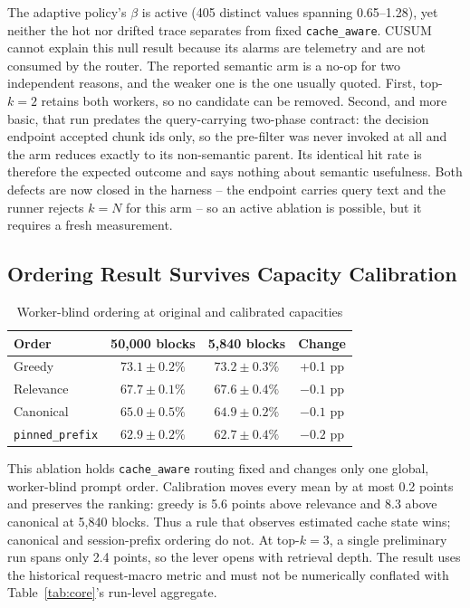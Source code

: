 \documentclass[conference]{IEEEtran}
\begin{document}
The adaptive policy's $\beta$ is active (405 distinct values spanning
0.65--1.28), yet neither the hot nor drifted trace separates from fixed
\texttt{cache\_aware}. CUSUM cannot explain this null result because its
alarms are telemetry and are not consumed by the router. The reported
semantic arm is a no-op for two independent reasons, and the weaker one is
the one usually quoted. First, top-$k{=}2$ retains both workers, so no
candidate can be removed. Second, and more basic, that run predates the
query-carrying two-phase contract: the decision endpoint accepted chunk ids
only, so the pre-filter was never invoked at all and the arm reduces
exactly to its non-semantic parent. Its identical hit rate is therefore the
expected outcome and says nothing about semantic usefulness. Both defects
are now closed in the harness -- the endpoint carries query text and the
runner rejects $k{=}N$ for this arm -- so an active ablation is possible,
but it requires a fresh measurement.

\subsection{Ordering Result Survives Capacity Calibration}

\begin{table}[t]
\caption{Worker-blind ordering at original and calibrated capacities}
\label{tab:ordering}
\centering
\footnotesize
\begin{tabular}{@{}lccc@{}}
\toprule
\textbf{Order} & \textbf{50{,}000 blocks} & \textbf{5{,}840 blocks} & \textbf{Change} \\
\midrule
Greedy & $73.1{\pm}0.2\%$ & $73.2{\pm}0.3\%$ & +0.1 pp \\
Relevance & $67.7{\pm}0.1\%$ & $67.6{\pm}0.4\%$ & $-0.1$ pp \\
Canonical & $65.0{\pm}0.5\%$ & $64.9{\pm}0.2\%$ & $-0.1$ pp \\
\texttt{pinned\_prefix} & $62.9{\pm}0.2\%$ & $62.7{\pm}0.4\%$ & $-0.2$ pp \\
\bottomrule
\end{tabular}
\end{table}

This ablation holds \texttt{cache\_aware} routing fixed and changes
only one global, worker-blind prompt order. Calibration moves every mean
by at most 0.2 points and preserves the ranking: greedy is 5.6 points
above relevance and 8.3 above canonical at 5{,}840 blocks. Thus a rule
that observes estimated cache state wins; canonical and session-prefix
ordering do not. At top-$k{=}3$, a single preliminary run spans only 2.4
points, so the lever opens with retrieval depth. The result uses the
historical request-macro metric and must not be numerically conflated
with Table~\ref{tab:core}'s run-level aggregate.
\end{document}
